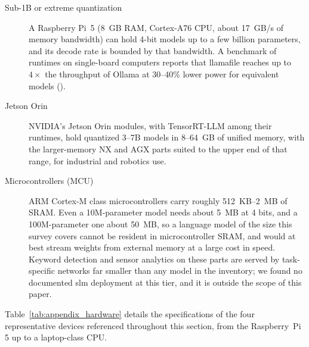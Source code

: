 \begin{description}
    \item[Sub-1B or extreme quantization] A Raspberry Pi~5 (8~GB RAM, Cortex-A76 CPU, about 17~GB/s of memory bandwidth) can hold 4-bit models up to a few billion parameters, and its decode rate is bounded by that bandwidth. A benchmark of runtimes on single-board computers reports that llamafile reaches up to $4\times$ the throughput of Ollama at 30--40\% lower power for equivalent models \citep{nguyen2025sbc} (\evB).

    \item[Jetson Orin] NVIDIA's Jetson Orin modules, with TensorRT-LLM \citep{nvidia_tensorrt2024} among their runtimes, hold quantized 3--7B models in 8--64~GB of unified memory, with the larger-memory NX and AGX parts suited to the upper end of that range, for industrial and robotics use.

    \item[Microcontrollers (MCU)] ARM Cortex-M class microcontrollers carry roughly 512~KB--2~MB of SRAM. Even a 10M-parameter model needs about 5~MB at 4 bits, and a 100M-parameter one about 50~MB, so a language model of the size this survey covers cannot be resident in microcontroller SRAM, and would at best stream weights from external memory at a large cost in speed. Keyword detection and sensor analytics on these parts are served by task-specific networks far smaller than any model in the inventory; we found no documented \gls{slm} deployment at this tier, and it is outside the scope of this paper.
\end{description}

Table~\ref{tab:appendix_hardware} details the specifications of the four
representative devices referenced throughout this section, from the Raspberry~Pi
5 up to a laptop-class CPU.

